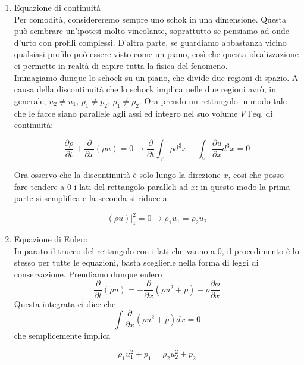 \documentclass{report}
\begin{document}
\begin{enumerate}
    \item Equazione di continuità \\
    Per comodità, considereremo sempre uno schok in una dimensione. Questa può sembrare un'ipotesi molto vincolante, soprattutto se pensiamo ad onde d'urto con profili complessi. D'altra parte, se guardiamo abbastanza vicino qualsiasi profilo può essere visto come un piano, così che questa idealizzazione ci permette in realtà di capire tutta la fisica del fenomeno. \\

    Immagiamo dunque lo schock su un piano, che divide due regioni di spazio. A causa della discontinuità che lo schock implica nelle due regioni avrò, in generale, $u_2 \neq u_1, \, p_1 \neq p_2, \, \rho_1 \neq \rho_2$. Ora prendo un rettangolo in modo tale che le facce siano parallele agli assi ed integro nel suo volume $V$ l'eq. di continuità: 

    \begin{equation}
        \frac{\partial \rho}{\partial t} + \frac{\partial}{\partial x}(\rho u) = 0 \rightarrow \frac{\partial}{\partial t} \int_V \rho d^3x + \int_V\frac{\partial u}{\partial x}d^3x = 0  
    \end{equation}

    Ora osservo che la discontinuità è solo lungo la direzione $x$, così che posso fare tendere a $0$ i lati del rettangolo paralleli ad $x$: in questo modo la prima parte si semplifica e la seconda si riduce a 
    \begin{tcolorbox}[colback=myg!15, colframe=black, boxrule=1pt]
    \begin{equation}
        (\rho u)|^2_1 = 0 \rightarrow \rho_1u_1 = \rho_2u_2
    \end{equation}
    \end{tcolorbox}
    \item Equazione di Eulero \\
    Imparato il trucco del rettangolo con i lati che vanno a $0$, il procedimento è lo stesso per tutte le equazioni, basta sceglierle nella forma di leggi di conservazione. Prendiamo dunque eulero 
    \begin{equation}
        \frac{\partial }{\partial t}(\rho u) = - \frac{\partial}{\partial x}(\rho u^2 + p) - \rho \frac{\partial \phi}{\partial x}
    \end{equation}
    Questa integrata ci dice che
    \begin{equation}
        \int \frac{\partial}{\partial x}(\rho u^2 +p)dx =0 
    \end{equation}
    che semplicemente implica 
    \begin{tcolorbox}[colback=myg!15, colframe=black, boxrule=1pt]
    \begin{equation}
        \rho_1u_1^2 + p_1  =\rho_2 u_2^2 + p_2
    \end{equation}
    \end{tcolorbox}


\end{enumerate}
\end{document}
